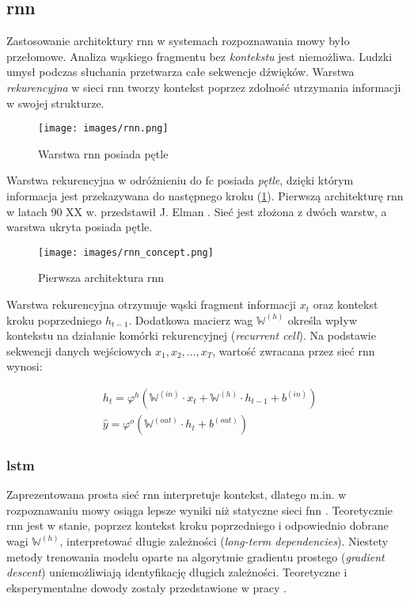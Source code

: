 \subsection*{\acrfull{rnn}}
Zastosowanie architektury \acrshort{rnn} w systemach rozpoznawania mowy było przełomowe. Analiza wąskiego fragmentu bez \emph{kontekstu} jest niemożliwa. Ludzki umysł podczas słuchania przetwarza całe sekwencje dźwięków. Warstwa \emph{rekurencyjna} w sieci \acrshort{rnn} tworzy kontekst poprzez zdolność utrzymania informacji w swojej strukturze.

\begin{figure}
    \centering
    \texttt{[image: images/rnn.png]}
    \caption{Warstwa \acrshort{rnn} posiada pętle \cite{lstm:colah}}
    \label{fig:rnn}
\end{figure}

Warstwa rekurencyjna w odróżnieniu do \acrshort{fc} posiada \emph{pętle}, dzięki którym informacja jest przekazywana do następnego kroku (\ref{fig:rnn}). Pierwszą architekturę \acrshort{rnn} w latach 90 XX w. przedstawił J. Elman \cite{rnn}. Sieć jest złożona z dwóch warstw, a warstwa ukryta posiada pętle. 

\begin{figure}
    \centering
    \texttt{[image: images/rnn\_concept.png]}
    \caption{Pierwsza architektura \acrshort{rnn} \cite{rnn}}
    \label{fig:rnn-2}
\end{figure}

Warstwa rekurencyjna otrzymuje wąski fragment informacji $x_t$ oraz kontekst kroku poprzedniego $h_{t-1}$. Dodatkowa macierz wag $\mathbb{W}^{(h)}$ określa wpływ kontekstu na działanie komórki rekurencyjnej (\textit{recurrent cell}). Na podstawie sekwencji danych wejściowych $x_1, x_2, ..., x_T$, wartość zwracana przez sieć \acrshort{rnn} wynosi:

\begin{align}
&h_t = \varphi^{h} (\mathbb{W}^{(in)} \cdot x_t + \mathbb{W}^{(h)} \cdot h_{t-1} + b^{(in)})\\
&\hat{y} = \varphi^{o} (\mathbb{W}^{(out)} \cdot h_t +  b^{(out)})
\end{align}

\subsubsection*{\acrfull{lstm}}
Zaprezentowana prosta sieć \acrshort{rnn} interpretuje kontekst, dlatego m.in. w rozpoznawaniu mowy osiąga lepsze wyniki niż statyczne sieci \acrshort{fnn} \cite{rnn_over_fnn}. Teoretycznie \acrshort{rnn} jest w stanie, poprzez kontekst kroku poprzedniego i odpowiednio dobrane wagi $\mathbb{W}^{(h)}$, interpretować długie zależności (\textit{long-term dependencies}). Niestety metody trenowania modelu oparte na algorytmie gradientu prostego (\textit{gradient descent}) uniemożliwiają identyfikację długich zależności. Teoretyczne i eksperymentalne dowody zostały przedstawione w pracy \cite{rnn_long-term-problems}.

